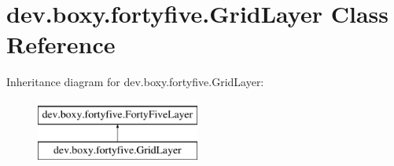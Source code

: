 \hypertarget{classdev_1_1boxy_1_1fortyfive_1_1_grid_layer}{
\section{dev.boxy.fortyfive.GridLayer Class Reference}
\label{d4/d48/classdev_1_1boxy_1_1fortyfive_1_1_grid_layer}
}
Inheritance diagram for dev.boxy.fortyfive.GridLayer:\begin{figure}[H]
\begin{center}
\leavevmode
\includegraphics[height=2.000000cm]{d4/d48/classdev_1_1boxy_1_1fortyfive_1_1_grid_layer}
\end{center}
\end{figure}
